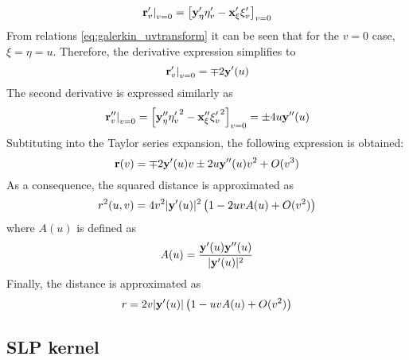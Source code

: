 \begin{equation}
	\left.{\bf r}'_v\right|_{v=0} = \left[{\bf y}'_{\eta} \eta'_v - {\bf x}'_{\xi} \xi'_v\right]_{v=0}
\end{equation}
%
From relations \eqref{eq:galerkin_uvtransform} it can be seen that for the $v=0$ case, $\xi = \eta = u$.
Therefore, the derivative expression simplifies to
%
\begin{equation}
	\left.{\bf r}'_v\right|_{v=0} = \mp 2 {\bf y}'(u) 
\end{equation}
%
The second derivative is expressed similarly as
%
\begin{equation}
	\left.{\bf r}''_v\right|_{v=0}
	=
	\left[
		{\bf y}''_\eta {\eta'_v}^2 - {\bf x}''_{\xi} {\xi'_v}^2
	\right]_{v=0}
	= \pm 4u {\bf y}''(u)
\end{equation}
%
Subtituting into the Taylor series expansion, the following expression is obtained:
%
\begin{equation}
	{\bf r}(v) = \mp 2 {\bf y}'(u) v 
	\pm 2u {\bf y}''(u) v^2 
	+ O(v^3)
\end{equation}
%
As a consequence, the squared distance is approximated as
%
\begin{equation}
	r^2(u,v) = 
	4v^2 |{\bf y}'(u)|^2
	\left(
	1
	-
	2 u v A(u)
	+ O(v^2)
	\right)
\end{equation}
%
where $A(u)$ is defined as
%
\begin{equation}
	A(u) = \frac{{\bf y}'(u) {\bf y}''(u)}{|{\bf y}'(u)|^2}
\end{equation}
%
Finally, the distance is approximated as
%
\begin{equation}
	r = 2v|{\bf y}'(u)| \left(1 - u v A(u) + O(v^2) \right)
	\label{eq:galerkin_face_taylor_r}
\end{equation}

\subsection{SLP kernel}

